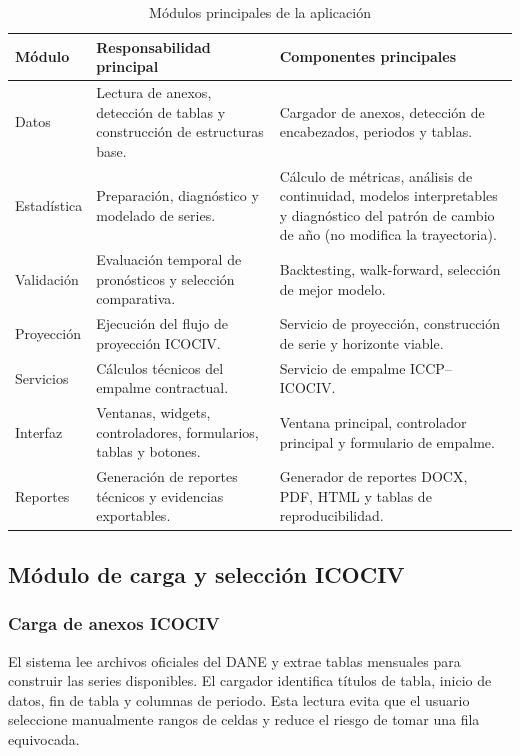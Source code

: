 \documentclass[12pt,letterpaper]{article}
\newcommand{\ICOCIV}{ICOCIV}
\newcommand{\ICCP}{ICCP}
\newcommand{\DANE}{DANE}
\begin{document}
\begin{table}[H]
\centering
\caption{Módulos principales de la aplicación}
\label{tab:modulos_app}
\vspace{\baselineskip}
\scriptsize
\begin{adjustbox}{max width=\textwidth}
\begin{tabularx}{\textwidth}{@{}p{3.2cm}YY@{}}
\toprule
\textbf{Módulo} & \textbf{Responsabilidad principal} & \textbf{Componentes principales} \\
\midrule
Datos & Lectura de anexos, detección de tablas y construcción de estructuras base. & Cargador de anexos, detección de encabezados, periodos y tablas. \\
Estadística & Preparación, diagnóstico y modelado de series. & Cálculo de métricas, análisis de continuidad, modelos interpretables y diagnóstico del patrón de cambio de año (no modifica la trayectoria). \\
Validación & Evaluación temporal de pronósticos y selección comparativa. & Backtesting, walk-forward, selección de mejor modelo. \\
Proyección & Ejecución del flujo de proyección \ICOCIV. & Servicio de proyección, construcción de serie y horizonte viable. \\
Servicios & Cálculos técnicos del empalme contractual. & Servicio de empalme \ICCP--\ICOCIV. \\
Interfaz & Ventanas, widgets, controladores, formularios, tablas y botones. & Ventana principal, controlador principal y formulario de empalme. \\
Reportes & Generación de reportes técnicos y evidencias exportables. & Generador de reportes DOCX, PDF, HTML y tablas de reproducibilidad. \\
\bottomrule
\end{tabularx}
\end{adjustbox}
\end{table}

\subsection{Módulo de carga y selección ICOCIV}

\subsubsection{Carga de anexos ICOCIV}

El sistema lee archivos oficiales del \DANE{} y extrae tablas mensuales para construir las series disponibles. El cargador identifica títulos de tabla, inicio de datos, fin de tabla y columnas de periodo. Esta lectura evita que el usuario seleccione manualmente rangos de celdas y reduce el riesgo de tomar una fila equivocada.
\end{document}
